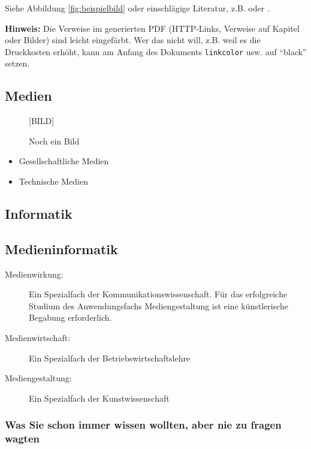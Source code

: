 \documentclass[11pt,a4paper,twoside]{article}
\begin{document}
Siehe Abbildung \ref{fig:beispielbild} oder einschlägige Literatur, z.B.
\cite[Seite 6]{Brill1992ATagger} oder \cite{Porter1980AnStripping}.

\bigskip %
\textbf{Hinweis:} Die Verweise im generierten PDF (HTTP-Links, Verweise auf Kapitel oder Bilder) sind leicht eingefärbt. Wer das nicht will, z.B. weil es die Druckkosten erhöht, kann am Anfang des Dokuments \texttt{linkcolor} usw. auf ``black'' setzen.


\subsection{Medien}

\begin{figure}
  \begin{center}\LARGE [BILD]\end{center}
  \caption{Noch ein Bild}
  \label{fig:beispielbild2}
\end{figure}

\begin{itemize}
  \item Gesellschaftliche Medien
  \item Technische Medien
\end{itemize}


\subsection{Informatik}


\subsection{Medieninformatik}

\begin{description}
  \item[Medienwirkung:] Ein Spezialfach der Kommunikationswissenschaft. Für das erfolgreiche Studium des Anwendungsfachs Mediengestaltung ist eine künstlerische Begabung erforderlich.
  \item[Medienwirtschaft:] Ein Spezialfach der Betriebswirtschaftslehre
  \item[Mediengestaltung:] Ein Spezialfach der Kunstwissenschaft
\end{description}

\subsubsection{Was Sie schon immer wissen wollten, aber nie zu fragen
  wagten}
\end{document}

